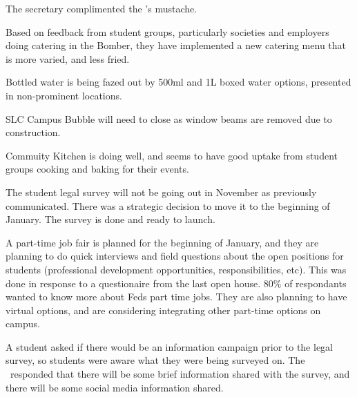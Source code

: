 \begin{information}

    The secretary complimented the \vpof's mustache. 

    Based on feedback from student groups, particularly societies and employers
    doing catering in the Bomber, they have implemented a new catering menu
    that is more varied, and less fried. 

    Bottled water is being fazed out by 500ml and 1L boxed water options, 
    presented in non-prominent locations.

    SLC Campus Bubble will need to close as window beams are removed due to 
    construction.

    Commuity Kitchen is doing well, and seems to have good uptake from student 
    groups cooking and baking for their events. 

    The student legal survey will not be going out in November as previously 
    communicated. There was a strategic decision to move it to the beginning 
    of January. The survey is done and ready to launch.

    A part-time job fair is planned for the beginning of January, and they are
    planning to do quick interviews and field questions about the open 
    positions for students (professional development opportunities, 
    responsibilities, etc). This was done in response to a questionaire from 
    the last open house. 80\% of respondants wanted to know more about Feds
    part time jobs. They are also planning to have virtual options, and are
    considering integrating other part-time options on campus.

    A student asked if there would be an information campaign prior to the 
    legal survey, so students were aware what they were being surveyed on. The
    \vped\ responded that there will be some brief information shared with the
    survey, and there will be some social media information shared. 

\end{information}

